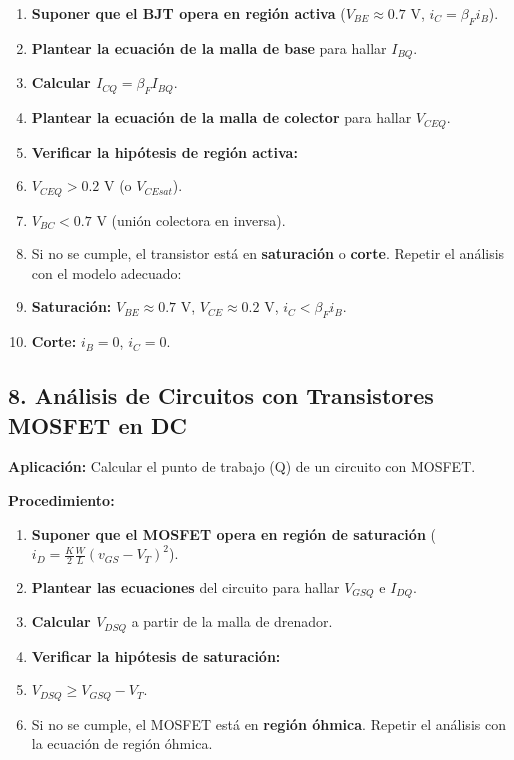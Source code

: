 \documentclass[11pt,a4paper]{article}
\begin{document}
\begin{enumerate}[leftmargin=*,topsep=2pt,itemsep=1pt]
  \item \textbf{Suponer que el BJT opera en región activa} ($V_{BE} \approx 0.7\text{ V}$, $i_C = \beta_F i_B$).
  \item \textbf{Plantear la ecuación de la malla de base} para hallar $I_{BQ}$.
  \item \textbf{Calcular $I_{CQ} = \beta_F I_{BQ}$}.
  \item \textbf{Plantear la ecuación de la malla de colector} para hallar $V_{CEQ}$.
  \item \textbf{Verificar la hipótesis de región activa:}
  \item $V_{CEQ} > 0.2\text{ V}$ (o $V_{CEsat}$).
  \item $V_{BC} < 0.7\text{ V}$ (unión colectora en inversa).
  \item Si no se cumple, el transistor está en \textbf{saturación} o \textbf{corte}. Repetir el análisis con el modelo adecuado:
  \item \textbf{Saturación:} $V_{BE} \approx 0.7\text{ V}$, $V_{CE} \approx 0.2\text{ V}$, $i_C < \beta_F i_B$.
  \item \textbf{Corte:} $i_B = 0$, $i_C = 0$.
\end{enumerate}


\subsection*{8. Análisis de Circuitos con Transistores MOSFET en DC}


\textbf{Aplicación:} Calcular el punto de trabajo (Q) de un circuito con MOSFET.


\textbf{Procedimiento:}


\begin{enumerate}[leftmargin=*,topsep=2pt,itemsep=1pt]
  \item \textbf{Suponer que el MOSFET opera en región de saturación} ($i_D = \frac{K}{2}\frac{W}{L}(v_{GS} - V_T)^2$).
  \item \textbf{Plantear las ecuaciones} del circuito para hallar $V_{GSQ}$ e $I_{DQ}$.
  \item \textbf{Calcular $V_{DSQ}$} a partir de la malla de drenador.
  \item \textbf{Verificar la hipótesis de saturación:}
  \item $V_{DSQ} \ge V_{GSQ} - V_T$.
  \item Si no se cumple, el MOSFET está en \textbf{región óhmica}. Repetir el análisis con la ecuación de región óhmica.
\end{enumerate}
\end{document}
